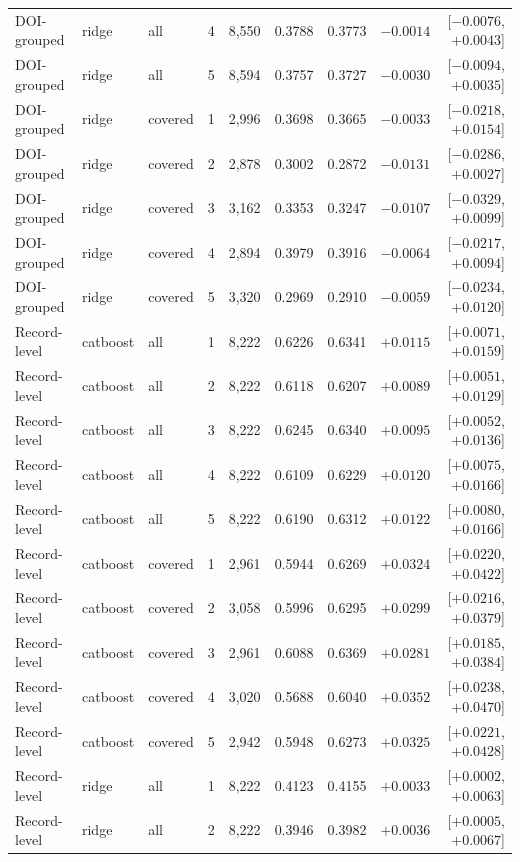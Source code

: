 \documentclass[10pt]{article}
\begin{document}
{\begin{longtable}{llllrrrrr}
DOI-grouped & ridge & all & 4 & 8,550 & 0.3788 & 0.3773 & $-0.0014$ & [$-0.0076$, $+0.0043$]\\
DOI-grouped & ridge & all & 5 & 8,594 & 0.3757 & 0.3727 & $-0.0030$ & [$-0.0094$, $+0.0035$]\\
DOI-grouped & ridge & covered & 1 & 2,996 & 0.3698 & 0.3665 & $-0.0033$ & [$-0.0218$, $+0.0154$]\\
DOI-grouped & ridge & covered & 2 & 2,878 & 0.3002 & 0.2872 & $-0.0131$ & [$-0.0286$, $+0.0027$]\\
DOI-grouped & ridge & covered & 3 & 3,162 & 0.3353 & 0.3247 & $-0.0107$ & [$-0.0329$, $+0.0099$]\\
DOI-grouped & ridge & covered & 4 & 2,894 & 0.3979 & 0.3916 & $-0.0064$ & [$-0.0217$, $+0.0094$]\\
DOI-grouped & ridge & covered & 5 & 3,320 & 0.2969 & 0.2910 & $-0.0059$ & [$-0.0234$, $+0.0120$]\\
Record-level & catboost & all & 1 & 8,222 & 0.6226 & 0.6341 & $+0.0115$ & [$+0.0071$, $+0.0159$]\\
Record-level & catboost & all & 2 & 8,222 & 0.6118 & 0.6207 & $+0.0089$ & [$+0.0051$, $+0.0129$]\\
Record-level & catboost & all & 3 & 8,222 & 0.6245 & 0.6340 & $+0.0095$ & [$+0.0052$, $+0.0136$]\\
Record-level & catboost & all & 4 & 8,222 & 0.6109 & 0.6229 & $+0.0120$ & [$+0.0075$, $+0.0166$]\\
Record-level & catboost & all & 5 & 8,222 & 0.6190 & 0.6312 & $+0.0122$ & [$+0.0080$, $+0.0166$]\\
Record-level & catboost & covered & 1 & 2,961 & 0.5944 & 0.6269 & $+0.0324$ & [$+0.0220$, $+0.0422$]\\
Record-level & catboost & covered & 2 & 3,058 & 0.5996 & 0.6295 & $+0.0299$ & [$+0.0216$, $+0.0379$]\\
Record-level & catboost & covered & 3 & 2,961 & 0.6088 & 0.6369 & $+0.0281$ & [$+0.0185$, $+0.0384$]\\
Record-level & catboost & covered & 4 & 3,020 & 0.5688 & 0.6040 & $+0.0352$ & [$+0.0238$, $+0.0470$]\\
Record-level & catboost & covered & 5 & 2,942 & 0.5948 & 0.6273 & $+0.0325$ & [$+0.0221$, $+0.0428$]\\
Record-level & ridge & all & 1 & 8,222 & 0.4123 & 0.4155 & $+0.0033$ & [$+0.0002$, $+0.0063$]\\
Record-level & ridge & all & 2 & 8,222 & 0.3946 & 0.3982 & $+0.0036$ & [$+0.0005$, $+0.0067$]\\

\end{longtable}}
\end{document}
